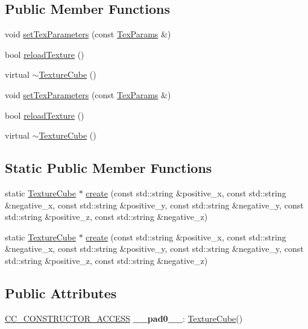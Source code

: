 \subsection*{Public Member Functions}
\begin{DoxyCompactItemize}
\item 
void \hyperlink{classTextureCube_ab93d82685a523fb9d1f236258da839b1}{set\+Tex\+Parameters} (const \hyperlink{classTexture2D_af2ea04a3dfcdf7274db17dda4bd555e3}{Tex\+Params} \&)
\item 
bool \hyperlink{classTextureCube_a859dc9c7dba6f8fda9ddd8eeb43320cf}{reload\+Texture} ()
\item 
virtual \hyperlink{classTextureCube_a37695ecaebde923647c1def15fc3dd99}{$\sim$\+Texture\+Cube} ()
\item 
void \hyperlink{classTextureCube_ab93d82685a523fb9d1f236258da839b1}{set\+Tex\+Parameters} (const \hyperlink{classTexture2D_af2ea04a3dfcdf7274db17dda4bd555e3}{Tex\+Params} \&)
\item 
bool \hyperlink{classTextureCube_a859dc9c7dba6f8fda9ddd8eeb43320cf}{reload\+Texture} ()
\item 
virtual \hyperlink{classTextureCube_a2811823e739aaa171649ee1de3dda98f}{$\sim$\+Texture\+Cube} ()
\end{DoxyCompactItemize}
\subsection*{Static Public Member Functions}
\begin{DoxyCompactItemize}
\item 
static \hyperlink{classTextureCube}{Texture\+Cube} $\ast$ \hyperlink{classTextureCube_a469adda77a9a06251e5c426f85ff75b9}{create} (const std\+::string \&positive\+\_\+x, const std\+::string \&negative\+\_\+x, const std\+::string \&positive\+\_\+y, const std\+::string \&negative\+\_\+y, const std\+::string \&positive\+\_\+z, const std\+::string \&negative\+\_\+z)
\item 
static \hyperlink{classTextureCube}{Texture\+Cube} $\ast$ \hyperlink{classTextureCube_a077fd2763b12bb68be96a9dab90b51fd}{create} (const std\+::string \&positive\+\_\+x, const std\+::string \&negative\+\_\+x, const std\+::string \&positive\+\_\+y, const std\+::string \&negative\+\_\+y, const std\+::string \&positive\+\_\+z, const std\+::string \&negative\+\_\+z)
\end{DoxyCompactItemize}
\subsection*{Public Attributes}
\begin{DoxyCompactItemize}
\item 
\mbox{\label{classTextureCube_a504647bae55af8fe5f630934b3dcf75b}} 
\hyperlink{_2cocos2d_2cocos_2base_2ccConfig_8h_a25ef1314f97c35a2ed3d029b0ead6da0}{C\+C\+\_\+\+C\+O\+N\+S\+T\+R\+U\+C\+T\+O\+R\+\_\+\+A\+C\+C\+E\+SS} {\bfseries \+\_\+\+\_\+pad0\+\_\+\+\_\+}\+: \hyperlink{classTextureCube}{Texture\+Cube}()
\end{DoxyCompactItemize}

